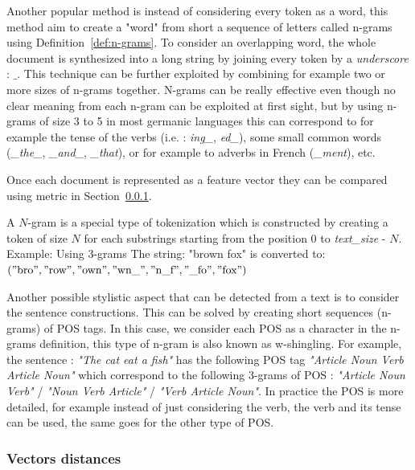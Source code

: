 Another popular method is instead of considering every token as a word, this method aim to create a "word" from short a sequence of letters called n-grams using Definition~\ref{def:n-grams}.
To consider an overlapping word, the whole document is synthesized into a long string by joining every token by a \textit{underscore} : $\_$.
This technique can be further exploited by combining for example two or more sizes of n-grams together.
N-grams can be really effective even though no clear meaning from each n-gram can be exploited at first sight, but by using n-grams of size 3 to 5 in most germanic languages this can correspond to for example the tense of the verbs (i.e. : \textit{ing\_}, \textit{ed\_}), some small common words (\textit{\_the\_}, \textit{\_and\_}, \textit{\_that}), or for example to adverbs in French (\textit{\_ment}), etc.

Once each document is represented as a feature vector they can be compared using metric in Section~\ref{sec:fv_distances}.

\begin{definition}[$n$-grams]
  \label{def:n-grams}
  A $N$-gram is a special type of tokenization which is constructed by creating a token of size $N$ for each substrings starting from the position $0$ to \textit{text\_size} - $N$.
  Example: Using 3-grams The string: "brown fox" is converted to: \\
  $("\text{bro}", "\text{row}", "\text{own}", "\text{wn\_}", "\text{n\_f}", "\text{\_fo}", "\text{fox}")$
\end{definition}

Another possible stylistic aspect that can be detected from a text is to consider the sentence constructions.
This can be solved by creating short sequences (n-grams) of POS tags.
In this case, we consider each POS as a character in the n-grams definition, this type of n-gram is also known as w-shingling.
For example, the sentence : \textit{"The cat eat a fish"} has the following POS tag \textit{"Article Noun Verb Article Noun"} which correspond to the following 3-grams of POS : \textit{"Article Noun Verb"} / \textit{"Noun Verb Article"} / \textit{"Verb Article Noun"}.
In practice the POS is more detailed, for example instead of just considering the verb, the verb and its tense can be used, the same goes for the other type of POS.

\subsubsection{Vectors distances}
\label{sec:fv_distances}

